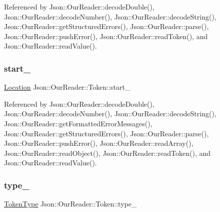 Referenced by Json\+::\+Our\+Reader\+::decode\+Double(), Json\+::\+Our\+Reader\+::decode\+Number(), Json\+::\+Our\+Reader\+::decode\+String(), Json\+::\+Our\+Reader\+::get\+Structured\+Errors(), Json\+::\+Our\+Reader\+::parse(), Json\+::\+Our\+Reader\+::push\+Error(), Json\+::\+Our\+Reader\+::read\+Token(), and Json\+::\+Our\+Reader\+::read\+Value().

\mbox{\label{classJson_1_1OurReader_1_1Token_aedf68bb00eaaa9d3c22b9825999602ac_aedf68bb00eaaa9d3c22b9825999602ac}} 
\subsubsection{\texorpdfstring{start\+\_\+}{start\_}}
{\footnotesize\ttfamily \hyperlink{classJson_1_1OurReader_a1bdc7bbc52ba87cae6b19746f2ee0189_a1bdc7bbc52ba87cae6b19746f2ee0189}{Location} Json\+::\+Our\+Reader\+::\+Token\+::start\+\_\+}



Referenced by Json\+::\+Our\+Reader\+::decode\+Double(), Json\+::\+Our\+Reader\+::decode\+Number(), Json\+::\+Our\+Reader\+::decode\+String(), Json\+::\+Our\+Reader\+::get\+Formatted\+Error\+Messages(), Json\+::\+Our\+Reader\+::get\+Structured\+Errors(), Json\+::\+Our\+Reader\+::parse(), Json\+::\+Our\+Reader\+::push\+Error(), Json\+::\+Our\+Reader\+::read\+Array(), Json\+::\+Our\+Reader\+::read\+Object(), Json\+::\+Our\+Reader\+::read\+Token(), and Json\+::\+Our\+Reader\+::read\+Value().

\mbox{\label{classJson_1_1OurReader_1_1Token_abe7d858530396fa7e1293f7a579880ed_abe7d858530396fa7e1293f7a579880ed}} 
\subsubsection{\texorpdfstring{type\+\_\+}{type\_}}
{\footnotesize\ttfamily \hyperlink{classJson_1_1OurReader_a15116f7276ddf1e7a2cc3cbefa884dcc_a15116f7276ddf1e7a2cc3cbefa884dcc}{Token\+Type} Json\+::\+Our\+Reader\+::\+Token\+::type\+\_\+}




